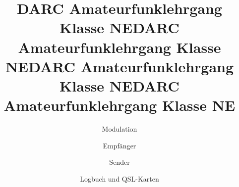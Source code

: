 \documentclass[aspectratio = 169]{beamer}
\begin{document}
\title{DARC Amateurfunklehrgang Klasse NE}
\author{Modulation}
\begin{frame}
\maketitle
\end{frame}














\title{DARC Amateurfunklehrgang Klasse NE}
\author{Empfänger}
\begin{frame}
\maketitle
\end{frame}














\title{DARC Amateurfunklehrgang Klasse NE}
\author{Sender}
\begin{frame}
\maketitle
\end{frame}












\title{DARC Amateurfunklehrgang Klasse NE}
\author{Logbuch und QSL-Karten}
\begin{frame}
\maketitle
\end{frame}


\end{document}
